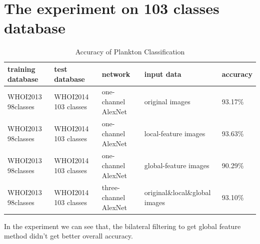\documentclass{article}
\begin{document}
\begin{figure}[!ht] 
  \centering 
  \hspace{0.3in} 
   \hspace{0.3in} 
\end{figure}
\section{The experiment on 103 classes database}
\begin{table}[!ht]
  \caption{Accuracy of Plankton Classification}
  \centering
  \begin{tabular}{lllll}
    \toprule
    \cmidrule{1-5}
    training database &test database &network  &input data   &accuracy  \\
    \midrule
    WHOI2013 98classes &WHOI2014 103 classes & one-channel AlexNet &original images   & 93.17\% \\ \hline
    WHOI2013 98classes &WHOI2014 103 classes  &one-channel  AlexNet &local-feature images & 93.63\%  \\ \hline
    WHOI2013 98classes &WHOI2014 103 classes  &one-channel  AlexNet &global-feature images   & 90.29\% \\ \hline
    WHOI2013 98classes &WHOI2014 103 classes  &three-channel  AlexNet &original\&local\&global images   & 93.10\% \\
    \bottomrule
  \end{tabular}
\end{table}

In the experiment we can see that, the bilateral filtering to get global feature method didn't get better overall accuracy.  
\end{document}
